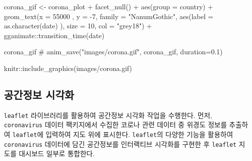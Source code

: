 \documentclass[
  letterpaper,
]{book}
\newenvironment{Shaded}{\begin{snugshade}}{\end{snugshade}}
\newcommand{\InformationTok}[1]{\textcolor[rgb]{0.37,0.37,0.37}{#1}}
\begin{document}
\begin{Shaded}
\begin{Highlighting}[]
\InformationTok{corona\_gif \textless{}{-} corona\_plot +}
\InformationTok{  facet\_null() +}
\InformationTok{  aes(group = country) +}
\InformationTok{  geom\_text(x = 55000 , y = {-}7,  }
\InformationTok{          family = "NanumGothic",  }
\InformationTok{          aes(label = as.character(date) ),  }
\InformationTok{          size = 10, col = "grey18")  +}
\InformationTok{  gganimate::transition\_time(date)}

\InformationTok{corona\_gif \# anim\_save("images/corona.gif", corona\_gif, duration=0.1)}

\InformationTok{knitr::include\_graphics(\textquotesingle{}images/corona.gif\textquotesingle{}) }
\InformationTok{\textasciigrave{}\textasciigrave{}\textasciigrave{}}
\end{Highlighting}
\end{Shaded}

\hypertarget{corona-19-leaflet}{%
\subsection{공간정보 시각화}\label{corona-19-leaflet}}

\texttt{leaflet} 라이브러리를 활용하여 공간정보 시각화 작업을 수행한다.
먼저, \texttt{coronavirus} 데이터 팩키지에서 수집한 코로나 관련 데이터
중 위경도 정보를 추출하여 \texttt{leaflet}에 입력하여 지도 위에
표시한다. \texttt{leaflet}의 다양한 기능을 활용하여 \texttt{coronavirus}
데이터에 담긴 공간정보를 인터랙티브 시각화를 구현한 후 \texttt{leaflet}
지도를 대시보드 일부로 통합한다.
\end{document}
